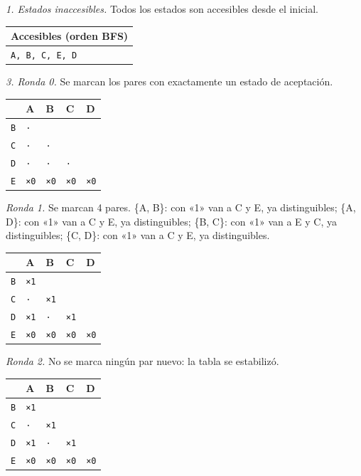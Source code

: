 \documentclass[11pt]{article}
\begin{document}
\textit{1. Estados inaccesibles.} Todos los estados son accesibles desde el inicial.
\begin{center}\footnotesize\begin{tabular}{l}\toprule
Accesibles (orden BFS) \\\midrule
\texttt{A, B, C, E, D} \\
\bottomrule\end{tabular}\end{center}
\textit{3. Ronda 0.} Se marcan los pares con exactamente un estado de aceptación.
\begin{center}\footnotesize\begin{tabular}{lllll}\toprule
 & A & B & C & D \\\midrule
\texttt{B} & \texttt{·} & \texttt{} & \texttt{} & \texttt{} \\
\texttt{C} & \texttt{·} & \texttt{·} & \texttt{} & \texttt{} \\
\texttt{D} & \texttt{·} & \texttt{·} & \texttt{·} & \texttt{} \\
\texttt{E} & \texttt{×0} & \texttt{×0} & \texttt{×0} & \texttt{×0} \\
\bottomrule\end{tabular}\end{center}
\textit{Ronda 1.} Se marcan 4 pares. \{A, B\}: con «1» van a C y E, ya distinguibles; \{A, D\}: con «1» van a C y E, ya distinguibles; \{B, C\}: con «1» van a E y C, ya distinguibles; \{C, D\}: con «1» van a C y E, ya distinguibles.
\begin{center}\footnotesize\begin{tabular}{lllll}\toprule
 & A & B & C & D \\\midrule
\texttt{B} & \texttt{×1} & \texttt{} & \texttt{} & \texttt{} \\
\texttt{C} & \texttt{·} & \texttt{×1} & \texttt{} & \texttt{} \\
\texttt{D} & \texttt{×1} & \texttt{·} & \texttt{×1} & \texttt{} \\
\texttt{E} & \texttt{×0} & \texttt{×0} & \texttt{×0} & \texttt{×0} \\
\bottomrule\end{tabular}\end{center}
\textit{Ronda 2.} No se marca ningún par nuevo: la tabla se estabilizó.
\begin{center}\footnotesize\begin{tabular}{lllll}\toprule
 & A & B & C & D \\\midrule
\texttt{B} & \texttt{×1} & \texttt{} & \texttt{} & \texttt{} \\
\texttt{C} & \texttt{·} & \texttt{×1} & \texttt{} & \texttt{} \\
\texttt{D} & \texttt{×1} & \texttt{·} & \texttt{×1} & \texttt{} \\
\texttt{E} & \texttt{×0} & \texttt{×0} & \texttt{×0} & \texttt{×0} \\
\bottomrule\end{tabular}\end{center}
\end{document}
